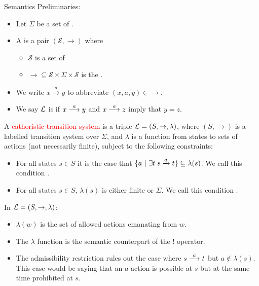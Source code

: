 \begin{frame}{Semantics}
Preliminaries:
\begin{itemize}
\item
Let $\Sigma$ be a set of .  
\item
A  is a pair $(\mathcal{S}, \rightarrow)$ where
\begin{itemize}
\item
$\mathcal{S}$ is a set of  
\item
$\rightarrow \subseteq
\mathcal{S} \times \Sigma \times \mathcal{S}$ is the .  
\end{itemize}
\item
 We write $x \xrightarrow{a} y$ to abbreviate $(x,a,y)
\in \rightarrow$. 
\item
We say $\mathcal{L}$ is  if $x \stackrel{a}{\longrightarrow} y$ and
$x \stackrel{a}{\longrightarrow} z$ imply that $y = z$. 
\end{itemize}
\end{frame}

\begin{frame}
A \textcolor{red}{cathoristic transition system} is a triple $\mathcal{L} = (S,
\rightarrow, \lambda)$, where $(S, \rightarrow)$ is a 
labelled transition system over $\Sigma$, and $\lambda$ is a function
from states to sets of actions (not necessarily finite), subject to
the following constraints:
\begin{itemize}

\item For all states $s \in S$ it is the case that $ \{a \ | \  \exists
  t \; s \xrightarrow{a} t\} \subseteq \lambda(s)$. We call this
  condition .

\item For all states $s \in S$, $\lambda (s)$ is either finite or
  $\Sigma$. We call this condition .

\end{itemize}
\end{frame}

\begin{frame}
In $\mathcal{L} = (S,\rightarrow, \lambda)$:
\begin{itemize}
\item
$\lambda(w)$ is the set of
allowed actions emanating from $w$.  
\item
The $\lambda$ function
is the semantic counterpart of the $!$ operator.  
\item
The admissibility
restriction rules out the case where $s \stackrel{a}{\longrightarrow} t$ but $a
\notin \lambda(s)$. This case would be saying that an $a$ action is possible at
$s$ but at the same time prohibited at $s$.
\end{itemize}
\end{frame}


